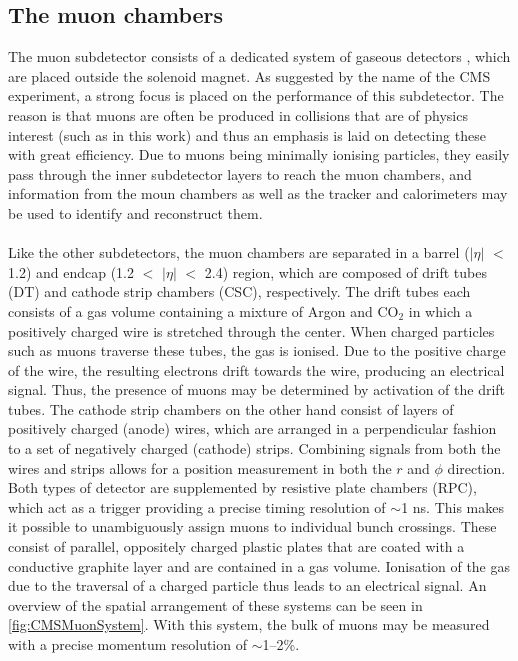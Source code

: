 \subsection{The muon chambers}
The muon subdetector consists of a dedicated system of gaseous detectors \cite{CMSMuonDetector}\cite{CMSMuonDetectorPerformance}, which are placed outside the solenoid magnet. As suggested by the name of the CMS experiment, a strong focus is placed on the performance of this subdetector. The reason is that muons are often be produced in collisions that are of physics interest (such as in this work) and thus an emphasis is laid on detecting these with great efficiency. Due to muons being minimally ionising particles, they easily pass through the inner subdetector layers to reach the muon chambers, and information from the moun chambers as well as the tracker and calorimeters may be used to identify and reconstruct them.\\
\\
Like the other subdetectors, the muon chambers are separated in a barrel ($\mid$$\eta$$\mid$ $<$ 1.2) and endcap (1.2 $<$ $\mid$$\eta$$\mid$ $<$ 2.4) region, which are composed of drift tubes (DT) and cathode strip chambers (CSC), respectively. The drift tubes each consists of a gas volume containing a mixture of Argon and CO$_2$ in which a positively charged wire is stretched through the center. When charged particles such as muons traverse these tubes, the gas is ionised. Due to the positive charge of the wire, the resulting electrons drift towards the wire, producing an electrical signal. Thus, the presence of muons may be determined by activation of the drift tubes. The cathode strip chambers on the other hand consist of layers of positively charged (anode) wires, which are arranged in a perpendicular fashion to a set of negatively charged (cathode) strips. Combining signals from both the wires and strips allows for a position measurement in both the $r$ and $\phi$ direction. Both types of detector are supplemented by resistive plate chambers (RPC), which act as a trigger providing a precise timing resolution of $\sim$1 ns. This makes it possible to unambiguously assign muons to individual bunch crossings. These consist of parallel, oppositely charged plastic plates that are coated with a conductive graphite layer and are contained in a gas volume. Ionisation of the gas due to the traversal of a charged particle thus leads to an electrical signal. An overview of the spatial arrangement of these systems can be seen in \autoref{fig:CMSMuonSystem}. With this system, the bulk of muons may be measured with a precise momentum resolution of $\sim$1--2\%. 

